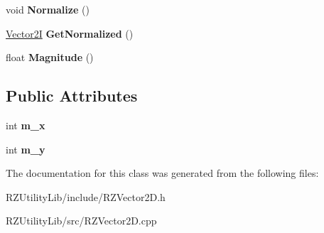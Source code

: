 \begin{DoxyCompactItemize}
\item 
\hypertarget{classrcz_engine_1_1_vector2_i_aa71d39a719eb2085317fae918fcb8c78}{}void {\bfseries Normalize} ()\label{classrcz_engine_1_1_vector2_i_aa71d39a719eb2085317fae918fcb8c78}

\item 
\hypertarget{classrcz_engine_1_1_vector2_i_ad6c868013d22d63f19c09983027649a6}{}\hyperlink{classrcz_engine_1_1_vector2_i}{Vector2\+I} {\bfseries Get\+Normalized} ()\label{classrcz_engine_1_1_vector2_i_ad6c868013d22d63f19c09983027649a6}

\item 
\hypertarget{classrcz_engine_1_1_vector2_i_ab4b68df99e574f5d14e64fc1e91bc173}{}float {\bfseries Magnitude} ()\label{classrcz_engine_1_1_vector2_i_ab4b68df99e574f5d14e64fc1e91bc173}

\end{DoxyCompactItemize}
\subsection*{Public Attributes}
\begin{DoxyCompactItemize}
\item 
\hypertarget{classrcz_engine_1_1_vector2_i_a9b0c06ddf599ab5eeefa19a82b1da1d5}{}int {\bfseries m\+\_\+x}\label{classrcz_engine_1_1_vector2_i_a9b0c06ddf599ab5eeefa19a82b1da1d5}

\item 
\hypertarget{classrcz_engine_1_1_vector2_i_ad3dbfc21a1fda36235a8ab77f8c12497}{}int {\bfseries m\+\_\+y}\label{classrcz_engine_1_1_vector2_i_ad3dbfc21a1fda36235a8ab77f8c12497}

\end{DoxyCompactItemize}


The documentation for this class was generated from the following files\+:\begin{DoxyCompactItemize}
\item 
R\+Z\+Utility\+Lib/include/R\+Z\+Vector2\+D.\+h\item 
R\+Z\+Utility\+Lib/src/R\+Z\+Vector2\+D.\+cpp\end{DoxyCompactItemize}
